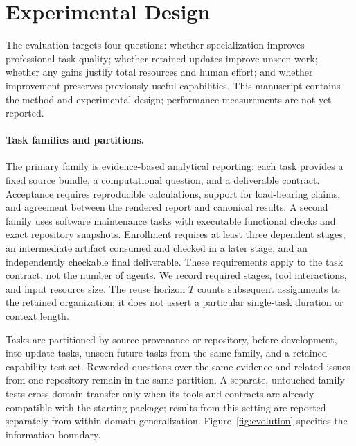 \section{Experimental Design}\label{sec:evaluation}
The evaluation targets four questions: whether specialization improves professional task quality; whether retained updates improve unseen work; whether any gains justify total resources and human effort; and whether improvement preserves previously useful capabilities. This manuscript contains the method and experimental design; performance measurements are not yet reported.

\paragraph{Task families and partitions.}
The primary family is evidence-based analytical reporting: each task provides a fixed source bundle, a computational question, and a deliverable contract. Acceptance requires reproducible calculations, support for load-bearing claims, and agreement between the rendered report and canonical results. A second family uses software maintenance tasks with executable functional checks and exact repository snapshots. Enrollment requires at least three dependent stages, an intermediate artifact consumed and checked in a later stage, and an independently checkable final deliverable. These requirements apply to the task contract, not the number of agents. We record required stages, tool interactions, and input resource size. The reuse horizon $T$ counts subsequent assignments to the retained organization; it does not assert a particular single-task duration or context length.

Tasks are partitioned by source provenance or repository, before development, into update tasks, unseen future tasks from the same family, and a retained-capability test set. Reworded questions over the same evidence and related issues from one repository remain in the same partition. A separate, untouched family tests cross-domain transfer only when its tools and contracts are already compatible with the starting package; results from this setting are reported separately from within-domain generalization. Figure~\ref{fig:evolution} specifies the information boundary.




